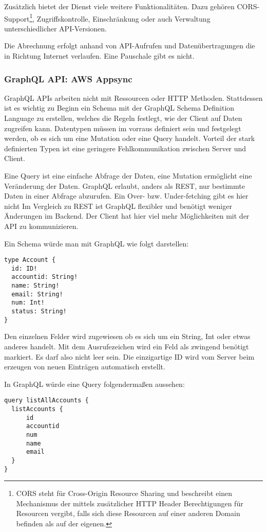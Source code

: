 Zusätzlich bietet der Dienst viele weitere Funktionalitäten. Dazu gehören CORS-Support\footnote{CORS steht für Cross-Origin Resource Sharing und
beschreibt einen Mechanismus der mittels zusätzlicher HTTP Header Berechtigungen für Resourcen vergibt, falls sich diese Resourcen auf einer anderen
Domain befinden als auf der eigenen.}, Zugriffskontrolle, Einschränkung oder auch Verwaltung unterschiedlicher
API-Versionen.

Die Abrechnung erfolgt anhand von API-Aufrufen und Datenübertragungen die in Richtung Internet verlaufen. Eine Pauschale gibt es nicht.\cite[]{APIGateway}


\subsubsection{GraphQL API: AWS Appsync}

GraphQL APIs arbeiten nicht mit Ressourcen oder HTTP Methoden.
Stattdessen ist es wichtig zu Beginn ein Schema mit der GraphQL Schema Definition Language zu erstellen, welches die Regeln festlegt, wie der Client auf Daten zugreifen kann.
Datentypen müssen im vorraus definiert sein und festgelegt werden, ob es sich
um eine Mutation oder eine Query handelt. Vorteil der stark definierten Typen ist
eine geringere Fehlkommunikation zwischen Server und Client.

Eine Query ist eine einfache Abfrage der Daten, eine Mutation ermöglicht eine Veränderung der Daten.
GraphQL erlaubt, anders als REST, nur bestimmte Daten in einer Abfrage abzurufen. Ein Over- bzw. Under-fetching gibt es hier nicht
Im Vergleich zu REST ist GraphQL flexibler und benötigt weniger Änderungen im Backend. Der Client hat hier viel mehr Möglichkeiten
mit der API zu kommunizieren.

Ein Schema würde man mit GraphQL wie folgt darstellen:
\begin{lstlisting}
type Account {
  id: ID!
  accountid: String!
  name: String!
  email: String!
  num: Int!
  status: String!
}
\end{lstlisting}

Den einzelnen Felder wird zugewiesen ob es sich um ein String, Int oder etwas anderes handelt. Mit dem Ausrufezeichen wird ein Feld als zwingend benötigt markiert.
Es darf also nicht leer sein. Die einzigartige ID wird vom Server beim erzeugen von neuen Einträgen automatisch erstellt.

In GraphQL würde eine Query folgendermaßen aussehen:
\begin{lstlisting}
query listAllAccounts {
  listAccounts {
      id
      accountid
      num
      name
      email
  }
}
\end{lstlisting}

